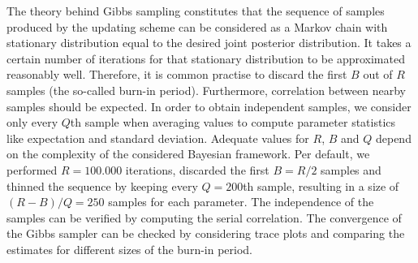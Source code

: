 \documentclass[article]{jss}
\begin{document}
The theory behind Gibbs sampling constitutes that the sequence of samples produced by the updating scheme can be considered as a Markov chain with stationary distribution equal to the desired joint posterior distribution. It takes a certain number of iterations for that stationary distribution to be approximated reasonably well. Therefore, it is common practise to discard the first $B$ out of $R$ samples (the so-called burn-in period). Furthermore, correlation between nearby samples should be expected. In order to obtain independent samples, we consider only every $Q$th sample when averaging values to compute parameter statistics like expectation and standard deviation. Adequate values for $R$, $B$ and $Q$ depend on the complexity of the considered Bayesian framework. Per default, we performed $R=100.000$ iterations, discarded the first $B=R/2$ samples and thinned the sequence by keeping every $Q=200$th sample, resulting in a size of $(R-B)/Q=250$ samples for each parameter. The independence of the samples can be verified by computing the serial correlation. The convergence of the Gibbs sampler can be checked by considering trace plots and comparing the estimates for different sizes of the burn-in period.
\end{document}
